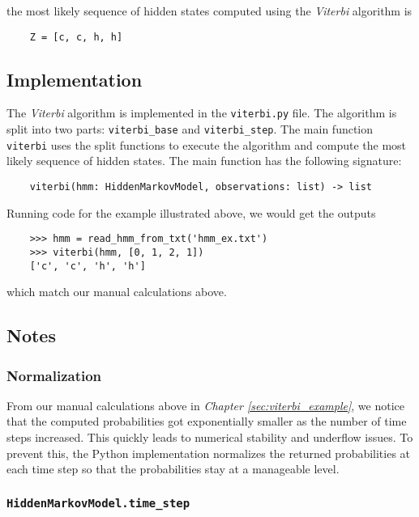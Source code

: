 \documentclass{article}
\theoremstyle{definition}
\begin{document}
the most likely sequence of hidden states computed using the \textit{Viterbi} algorithm is

\begin{verbatim}
    Z = [c, c, h, h]
\end{verbatim}

\subsection{Implementation}

The \textit{Viterbi} algorithm is implemented in the \texttt{viterbi.py} file. The algorithm is split into two parts: \texttt{viterbi\_base} and \texttt{viterbi\_step}. The main function \texttt{viterbi} uses the split functions to execute the algorithm and compute the most likely sequence of hidden states. The main function has the following signature:

\begin{verbatim}
    viterbi(hmm: HiddenMarkovModel, observations: list) -> list
\end{verbatim}

Running code for the example illustrated above, we would get the outputs

\begin{verbatim}
    >>> hmm = read_hmm_from_txt('hmm_ex.txt')
    >>> viterbi(hmm, [0, 1, 2, 1])
    ['c', 'c', 'h', 'h']
\end{verbatim}

which match our manual calculations above.

\subsection{Notes}

\subsubsection{Normalization}

From our manual calculations above in \textit{Chapter \ref{sec:viterbi_example}}, we notice that the computed probabilities got exponentially smaller as the number of time steps increased. This quickly leads to numerical stability and underflow issues. To prevent this, the Python implementation normalizes the returned probabilities at each time step so that the probabilities stay at a manageable level.

\subsubsection{\texttt{HiddenMarkovModel.time\_step}}
\end{document}
